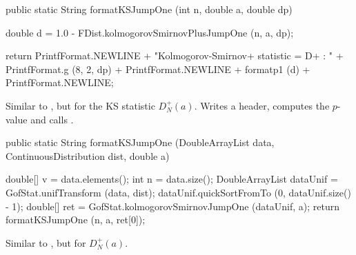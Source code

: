\begin{code}

   public static String formatKSJumpOne (int n, double a, double dp)\begin{hide} {
      double d = 1.0 - FDist.kolmogorovSmirnovPlusJumpOne (n, a, dp);

      return PrintfFormat.NEWLINE +
             "Kolmogorov-Smirnov+ statistic = D+    : " +
             PrintfFormat.g (8, 2, dp) + PrintfFormat.NEWLINE +
             formatp1 (d) + PrintfFormat.NEWLINE;
   }\end{hide}
\end{code}
\begin{tabb}  Similar to ,
   but for the KS statistic $D_N^+(a)$.
   Writes a header,
  computes the $p$-value and calls .
\end{tabb}
\begin{htmlonly}
\end{htmlonly}
\begin{code}

   public static String formatKSJumpOne (DoubleArrayList data,
                                         ContinuousDistribution dist,
                                         double a)\begin{hide} {

      double[] v = data.elements();
      int n = data.size();
      DoubleArrayList dataUnif = GofStat.unifTransform (data, dist);
      dataUnif.quickSortFromTo (0, dataUnif.size() - 1);
      double[] ret =  GofStat.kolmogorovSmirnovJumpOne (dataUnif, a);
      return formatKSJumpOne (n, a, ret[0]);
   }\end{hide}
\end{code}
\begin{tabb} Similar to ,
  but for $D_N^+(a)$.
\end{tabb}
\begin{htmlonly}
\end{htmlonly}

